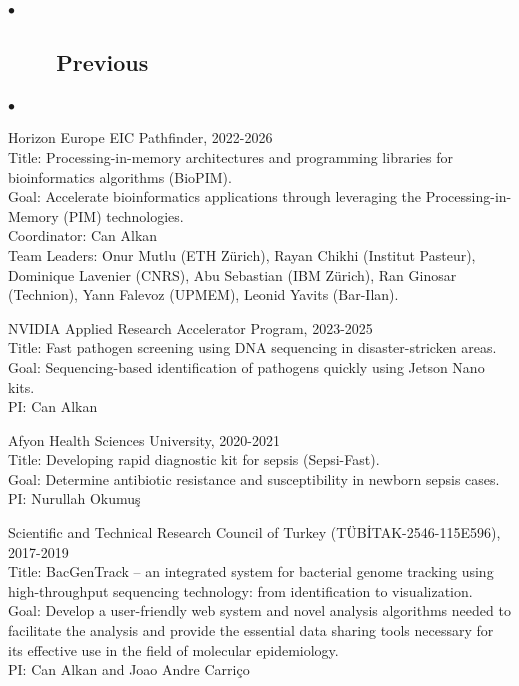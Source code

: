 \documentclass[margin,line]{res}
\newenvironment{list2}{
  \begin{list}{$\bullet$}{%
      \setlength{\itemsep}{0.1cm}
      \setlength{\parsep}{0in} \setlength{\parskip}{0in}
      \setlength{\topsep}{0in} \setlength{\partopsep}{0in} 
      \setlength{\leftmargin}{0.2in}}}{\end{list}}
\begin{document}
\begin{resume}
\begin{list2}
  \end{list2}


\vspace{-0.5cm}
        \subsection{\small \sc ~~~~Previous}
        \begin{list2}
    \item
    Horizon Europe EIC Pathfinder, 2022-2026\\
    Title: Processing-in-memory architectures and programming libraries for bioinformatics algorithms (BioPIM).\\
    Goal: Accelerate bioinformatics applications through leveraging the Processing-in-Memory (PIM) technologies.\\
    Coordinator: Can Alkan\\
    Team Leaders: Onur Mutlu (ETH Zürich), Rayan Chikhi (Institut Pasteur), Dominique Lavenier (CNRS), Abu Sebastian (IBM Zürich), Ran Ginosar (Technion), Yann Falevoz (UPMEM), Leonid Yavits (Bar-Ilan).
                
                                         \item
        NVIDIA Applied Research Accelerator Program, 2023-2025\\
        Title: Fast pathogen screening using DNA sequencing in disaster-stricken areas.\\
        Goal: Sequencing-based identification of pathogens quickly using Jetson Nano kits.\\
        PI: Can Alkan
                                       \item
        Afyon Health Sciences University, 2020-2021\\
        Title: Developing rapid diagnostic kit for sepsis (Sepsi-Fast).\\
        Goal: Determine antibiotic resistance and susceptibility in newborn sepsis cases.\\
        PI: Nurullah Okumuş
                                       \item
                                         Scientific and Technical Research Council of Turkey (T\"{U}B\.{I}TAK-2546-115E596), 2017-2019\\
                                         Title: BacGenTrack – an integrated system for bacterial genome tracking using high-throughput sequencing technology: from identification to visualization.\\
                                         Goal: Develop a user-friendly web system and novel analysis algorithms needed to facilitate the analysis and provide the essential data sharing tools necessary for its effective use in the field of molecular epidemiology.\\
                                         PI: Can Alkan and Joao Andre Carriço


\end{list2}
\end{resume}
\end{document}
